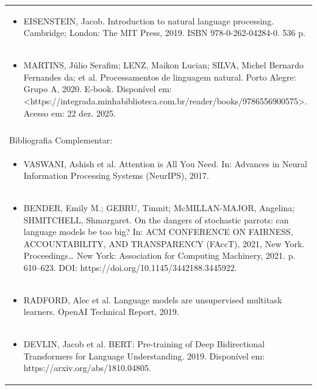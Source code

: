 \documentclass[11pt]{article}
\begin{document}
\begin{center}
\begin{longtable}{|p{4cm}|p{4cm}|p{4cm}|p{4cm}|}
\multicolumn{4}{|p{\dimexpr 16cm + 6\tabcolsep\relax}|}{\begin{itemize}\item EISENSTEIN, Jacob. Introduction to natural language processing. Cambridge; London: The MIT Press, 2019. ISBN 978-0-262-04284-0. 536 p.\end{itemize}}\\
\multicolumn{4}{|p{\dimexpr 16cm + 6\tabcolsep\relax}|}{\begin{itemize}\item MARTINS, Júlio Serafim; LENZ, Maikon Lucian; SILVA, Michel Bernardo Fernandes da; et al. Processamentos de linguagem natural. Porto Alegre: Grupo A, 2020. E-book. Disponível em: <https://integrada.minhabiblioteca.com.br/reader/books/9786556900575>. Acesso em: 22 dez. 2025.\end{itemize}}\\
\multicolumn{4}{|p{16cm}|}{}\\
\hline
\multicolumn{4}{|p{16cm}|}{Bibliografia Complementar:}\\*
\multicolumn{4}{|p{\dimexpr 16cm + 6\tabcolsep\relax}|}{\begin{itemize}\item VASWANI, Ashish et al. Attention is All You Need. In: Advances in Neural Information Processing Systems (NeurIPS), 2017.\end{itemize}}\\
\multicolumn{4}{|p{\dimexpr 16cm + 6\tabcolsep\relax}|}{\begin{itemize}\item BENDER, Emily M.; GEBRU, Timnit; McMILLAN-MAJOR, Angelina; SHMITCHELL, Shmargaret. On the dangers of stochastic parrots: can language models be too big? In: ACM CONFERENCE ON FAIRNESS, ACCOUNTABILITY, AND TRANSPARENCY (FAccT), 2021, New York. Proceedings… New York: Association for Computing Machinery, 2021. p. 610–623. DOI: https://doi.org/10.1145/3442188.3445922.\end{itemize}}\\
\multicolumn{4}{|p{\dimexpr 16cm + 6\tabcolsep\relax}|}{\begin{itemize}\item RADFORD, Alec et al. Language models are unsupervised multitask learners. OpenAI Technical Report, 2019.\end{itemize}}\\
\multicolumn{4}{|p{\dimexpr 16cm + 6\tabcolsep\relax}|}{\begin{itemize}\item DEVLIN, Jacob et al. BERT: Pre-training of Deep Bidirectional Transformers for Language Understanding. 2019. Disponível em: https://arxiv.org/abs/1810.04805.\end{itemize}}\\

\end{longtable}
\end{center}
\end{document}
